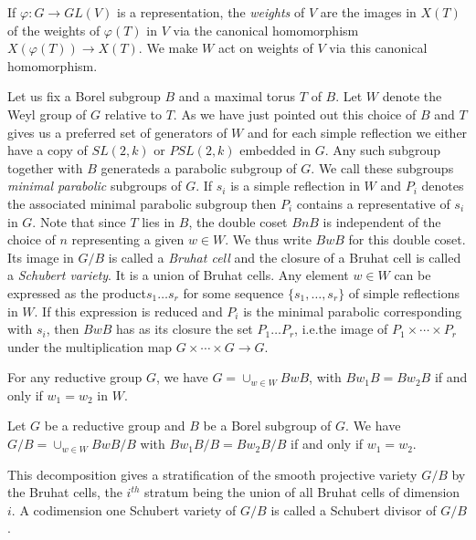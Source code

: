 If $\varphi:G\to GL(V)$ is a representation, the {\em weights} of $V$
are the images in $X(T)$ of the weights of $\varphi(T)$ in $V$ via the
canonical homomorphism $X(\varphi(T))\to X(T)$. We make $W$ act on
weights of $V$ via this canonical homomorphism.

Let us fix a Borel subgroup $B$ and a maximal torus $T$ of $B$. Let
$W$ denote the Weyl group of $G$ relative to $T$. As we have just
pointed out this choice of $B$ and $T$ gives us a preferred set of
generators of $W$ and for each simple reflection we either have a copy
of $SL(2,k)$ or $PSL(2,k)$ embedded in $G$. Any such subgroup together
with $B$ generateds a parabolic subgroup of $G$. We call these
subgroups {\em minimal parabolic} 
subgroups of $G$. If $s_{i}$ is a
simple reflection in $W$ and $P_{i}$ denotes the associated minimal
parabolic subgroup then $P_{i}$ contains a representative of $s_{i}$
in $G$. Note that since $T$ lies in $B$, the double coset $BnB$ is
independent of the choice of $n$ representing a given $w\in W$. We
thus write $BwB$ for this double coset. Its image in $G/B$ is called a
{\em Bruhat cell} and the closure of a Bruhat cell
is called a {\em 
  Schubert variety}. It is a union of Bruhat cells. Any element $w\in
W$ can be expressed as the product\pageoriginale $s_{1}\ldots s_{r}$
for some sequence $\{s_{1},\ldots,s_{r}\}$ of simple reflections in
$W$. If this expression is reduced 
and $P_{i}$ is the minimal
parabolic corresponding with $s_{i}$, then $BwB$ has as its closure
the set $P_{1}\ldots P_{r}$, i.e.\@ the image of $P_{1}\times
\cdots\times P_{r}$ under the multiplication map $G\times\cdots\times
G\to G$.

\label{page5}
\begin{theorem}\label{chap1-thm1.1.3} 
For any reductive group $G$, we have $G=\cup_{w\in W}BwB$, with
$Bw_{1}B=Bw_{2}B$ if and only if $w_{1}=w_{2}$ in $W$.
\end{theorem}

\begin{corollary}\label{chap1-coro1.1.4}
Let $G$ be a reductive group and $B$ be a Borel subgroup of $G$. We
have $G/B=\cup_{w\in W} BwB/B$ with $Bw_{1}B/B=Bw_{2}B/B$ if and only
if $w_{1}=w_{2}$.
\end{corollary}

This decomposition gives a stratification of the smooth projective
variety $G/B$ by the Bruhat cells, the $i^{th}$ stratum being the
union of all Bruhat cells of dimension $i$. A codimension one Schubert
variety of $G/B$ is called a Schubert divisor of $G/B$.

